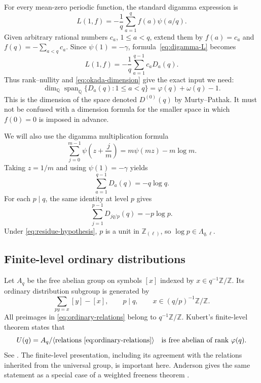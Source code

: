 \documentclass[11pt,a4paper]{article}
\theoremstyle{definition}
\theoremstyle{remark}
\newcommand{\Q}{\mathbb Q}
\newcommand{\Z}{\mathbb Z}
\newcommand{\Zloc}{\Z_{(\ell)}}
\DeclareMathOperator{\spanop}{span}
\begin{document}
For every mean-zero periodic function, the standard digamma expression
is
\begin{equation}\label{eq:digamma-L}
 L(1,f)=-\frac1q\sum_{a=1}^{q}f(a)\psi(a/q).
\end{equation}
Given arbitrary rational numbers $c_a$, $1\le a<q$, extend them by
$f(a)=c_a$ and $f(q)=-\sum_{a<q}c_a$. Since $\psi(1)=-\gamma$,
formula~\eqref{eq:digamma-L} becomes
\[
 L(1,f)=-\frac1q\sum_{a=1}^{q-1}c_aD_a(q).
\]
Thus rank--nullity and \eqref{eq:okada-dimension} give the exact input
we need:
\begin{equation}\label{eq:digamma-dimension}
 \dim_\Q\spanop_\Q\{D_a(q):1\le a<q\}
 =\varphi(q)+\omega(q)-1.
\end{equation}
This is the dimension of the space denoted $D^{(0)}(q)$ by
Murty--Pathak. It must not be confused with a dimension formula for
the smaller space in which $f(0)=0$ is imposed in advance.

We will also use the digamma multiplication formula
\begin{equation}\label{eq:multiplication}
 \sum_{j=0}^{m-1}\psi\left(z+\frac jm\right)
 =m\psi(mz)-m\log m.
\end{equation}
Taking $z=1/m$ and using $\psi(1)=-\gamma$ yields
\begin{equation}\label{eq:total-digamma}
 \sum_{a=1}^{q-1}D_a(q)=-q\log q.
\end{equation}
For each $p\mid q$, the same identity at level $p$ gives
\begin{equation}\label{eq:prime-log-in-span}
 \sum_{j=1}^{p-1}D_{jq/p}(q)=-p\log p.
\end{equation}
Under \eqref{eq:residue-hypothesis}, $p$ is a unit in $\Zloc$, so
$\log p\in\Lambda_{q,\ell}$.

\subsection{Finite-level ordinary distributions}

Let $A_q$ be the free abelian group on symbols $[x]$ indexed by
$x\in q^{-1}\Z/\Z$. Its ordinary distribution subgroup is generated by
\begin{equation}\label{eq:ordinary-relations}
 \sum_{py=x}[y]-[x],
 \qquad p\mid q,\qquad x\in(q/p)^{-1}\Z/\Z.
\end{equation}
All preimages in \eqref{eq:ordinary-relations} belong to $q^{-1}\Z/\Z$.
Kubert's finite-level theorem states that
\begin{equation}\label{eq:kubert}
 U(q)=A_q/\langle\text{relations \eqref{eq:ordinary-relations}}\rangle
 \quad\text{is free abelian of rank }\varphi(q).
\end{equation}
See \cite[Theorems~1.8 and~4.14]{Kubert}. The finite-level presentation,
including its agreement with the relations inherited from the universal
group, is important here. Anderson gives the same statement as a
special case of a weighted freeness theorem
\cite[Theorem~4.3.1(I) and~\S5.3]{Anderson}.
\end{document}
